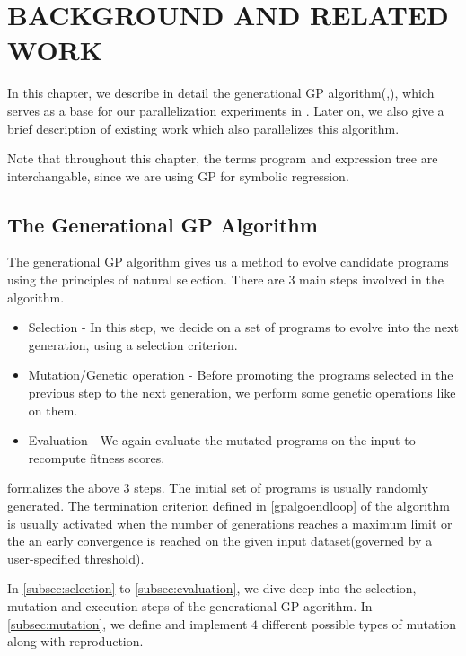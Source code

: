 \chapter{BACKGROUND AND RELATED WORK}
\label{chap:bgrw}
In this chapter, we describe in detail the generational GP algorithm(\citep{poli08:fieldguide},\citep{RFIgp2016}), which serves as a base for our parallelization experiments in . Later on, we also give a brief description of existing work which also parallelizes this algorithm.

Note that throughout this chapter, the terms program and expression tree are interchangable, since we are using GP for symbolic regression. 

\section{The Generational GP Algorithm}
\label{bgrw:algo}
The generational GP algorithm gives us a method to evolve candidate programs using the principles of natural selection. There are $3$ main steps involved in the algorithm. 
\begin{itemize}
  \item Selection - In this step, we decide on a set of programs to evolve into the next generation, using a selection criterion. 
  \item Mutation/Genetic operation - Before promoting the programs selected in the previous step to the next generation, we perform some genetic operations like  on them. 
  \item Evaluation - We again evaluate the mutated programs on the input to recompute fitness scores. 
\end{itemize}

 formalizes the above $3$ steps. The initial set of programs is usually randomly generated. The termination criterion defined in \cref*{gpalgoendloop} of the algorithm is usually activated when the number of generations reaches a maximum limit or the an early convergence is reached on the given input dataset(governed by a user-specified threshold).

In \cref*{subsec:selection} to \cref*{subsec:evaluation}, we dive deep into the selection, mutation and execution steps of the generational GP agorithm. In \cref*{subsec:mutation}, we define and implement $4$ different possible types of mutation along with reproduction.


